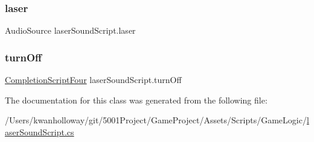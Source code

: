 \subsubsection{\texorpdfstring{laser}{laser}}
{\footnotesize\ttfamily Audio\+Source laser\+Sound\+Script.\+laser}

\mbox{\label{classlaser_sound_script_a59d0d535475bebd3c0d0ea799c7e8e92}} 
\subsubsection{\texorpdfstring{turn\+Off}{turnOff}}
{\footnotesize\ttfamily \hyperlink{class_completion_script_four}{Completion\+Script\+Four} laser\+Sound\+Script.\+turn\+Off}



The documentation for this class was generated from the following file\+:\begin{DoxyCompactItemize}
\item 
/\+Users/kwanholloway/git/5001\+Project/\+Game\+Project/\+Assets/\+Scripts/\+Game\+Logic/\hyperlink{laser_sound_script_8cs}{laser\+Sound\+Script.\+cs}\end{DoxyCompactItemize}
